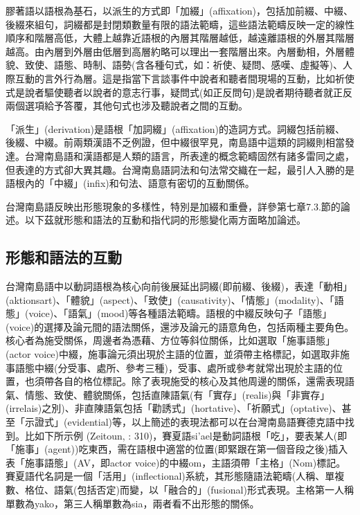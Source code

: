\begin{styleii}
膠著語以語根為基石，以派生的方式即「加綴」(affixation)\textsf{，}包括加前綴、中綴、後綴來組句，詞綴都是封閉類數量有限的語法範疇，這些語法範疇反映一定的線性順序和階層高低，大體上越靠近語根的內層其階層越低，越遠離語根的外層其階層越高。由內層到外層由低層到高層約略可以理出一套階層出來。內層動相，外層體貌、致使、語態、時制、語勢(含各種句式，如：祈使、疑問、感嘆、虛擬等)、人際互動的言外行為層。這是指當下言談事件中說者和聽者間現場的互動，比如祈使式是說者驅使聽者以說者的意志行事，疑問式(如正反問句)是說者期待聽者就正反兩個選項給予答覆，其他句式也涉及聽說者之間的互動。
\end{styleii}

\textrm{「派生」(derivation)是語根「加詞綴」(affixation)的造詞方式。詞綴包括前綴、後綴、中綴。前兩類漢語不乏例證，但中綴很罕見，南島語中這類的詞綴則相當發達。台灣南島語和漢語都是人類的語言，所表達的概念範疇固然有諸多雷同之處，但表達的方式卻大異其趣。台灣南島語詞法和句法常交織在一起，最引人入勝的是語根內的「中綴」(infix)和句法、語意有密切的互動關係。}

\textrm{台灣南島語反映出形態現象的多樣性，特別是加綴和重疊，詳參第七章7.3.節的論述。}以下茲就形態和語法的互動和指代詞的形態變化兩方面略加論述。

\subsection{\textrm{形態和語法的互動}}

\textrm{台灣南島語中以動詞語根為核心向前後展延出詞綴(即前綴、後綴)}，\textrm{表達「動相」(aktionsart)}、\textrm{「體貌」(aspect)}、\textrm{「致使」(causativity)}、\textrm{「情態」(modality)}、\textrm{「語態」(voice)}、\textrm{「語氣」(mood)等各種語法範疇。語根的中綴反映句子「語態」(voice)的選擇及論元間的語法關係，還涉及論元的語意角色，包括兩種主要角色。核心者為施受關係，周邊者為憑藉、方位等斜位關係，比如選取「施事語態」(actor voice)中綴，施事論元須出現於主語的位置，並須帶主格標記，如選取非施事語態中綴(分受事、處所、參考三種)}，\textrm{受事、處所或參考就常出現於主語的位置，也須帶各自的格位標記。除了表現施受的核心及其他周邊的關係，還需表現語氣、情態、致使、體貌關係，包括直陳語氣(有「實存」(realis)與「非實存」(irrelais)之別)}、\textrm{非直陳語氣包括「勸誘式」(hortative)}、\textrm{「祈願式」(optative)}、\textrm{甚至「示證式」(evidential)等，以上簡述的表現法都可以在台灣南島語賽德克語中找到。比如下所示例 (Zeitoun, \citealt{ChuKaybaybaw2015}: 310)}，\textrm{賽夏語si’ael是動詞語根「吃」，要表某人(即「施事」(agent))吃東西，需在語根中適當的位置(即緊跟在第一個音段之後)插入表「施事語態」(AV，即actor voice)的中綴om}，\textrm{主語須帶「主格」(Nom)標記。賽夏語代名詞是一個「活用」(inflectional)系統，其形態隨語法範疇(人稱、單複數、格位、語氣(包括否定)而變，以「融合的」(fusional)形式表現。主格第一人稱單數為yako，第三人稱單數為sia，兩者看不出形態的關係。}

